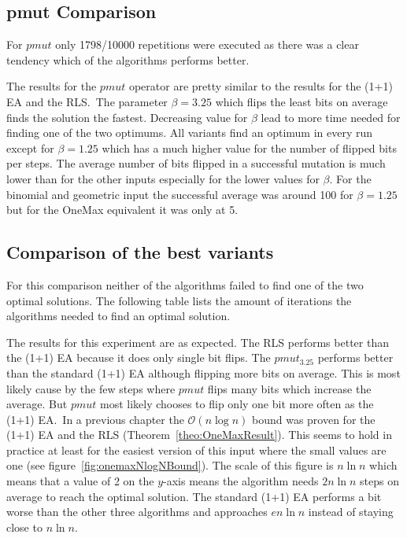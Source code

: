 \subsection{pmut Comparison}
For $pmut$ only 1798/10000 repetitions were executed as there was a clear tendency which of the algorithms performs better.



The results for the $pmut$ operator are pretty similar to the results for the (1+1) EA and the RLS.\
The parameter $\beta=3.25$ which flips the least bits on average finds the solution the fastest.
Decreasing value for $\beta$ lead to more time needed for finding one of the two optimums.
All variants find an optimum in every run except for $\beta=1.25$ which has a much higher value for the number of flipped bits per steps.
The average number of bits flipped in a successful mutation is much lower than for the other inputs especially for the lower values for $\beta$.
For the binomial and geometric input the successful average was around 100 for $\beta=1.25$ but for the OneMax equivalent it was only at 5.

\subsection{Comparison of the best variants}
% 
% 
For this comparison neither of the algorithms failed to find one of the two optimal solutions.
The following table lists the amount of iterations the algorithms needed to find an optimal solution.



The results for this experiment are as expected.
The RLS performs better than the (1+1) EA because it does only single bit flips.
The $pmut_{3.25}$ performs better than the standard (1+1) EA although flipping more bits on average.
This is most likely cause by the few steps where $pmut$ flips many bits which increase the average.
But $pmut$ most likely chooses to flip only one bit more often as the (1+1) EA.\
In a previous chapter the $\mathcal{O}(n\log n)$ bound was proven for the (1+1) EA and the RLS (Theorem~\ref{theo:OneMaxResult}).
This seems to hold in practice at least for the easiest version of this input where the small values are one (see figure~\ref{fig:onemaxNlogNBound}).
The scale of this figure is $n\ln n$ which means that a value of 2 on the $y$-axis means the algorithm needs $2n\ln n$ steps on average to reach the optimal solution.
The standard (1+1) EA performs a bit worse than the other three algorithms and approaches $en\ln n$ instead of staying close to $n\ln n$.

